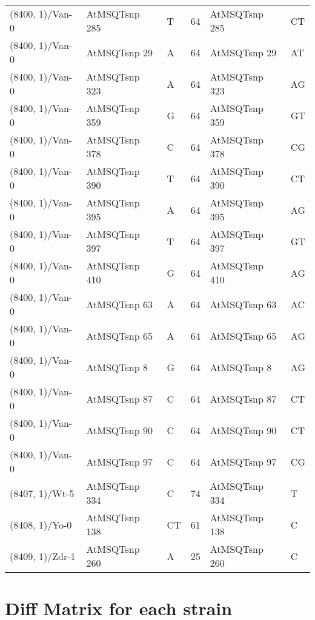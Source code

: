 \begin{center}
\begin{longtable}{|l|l|l|l|l|l|}
(8400, 1)/Van-0&AtMSQTsnp 285&T&64&AtMSQTsnp 285&CT\\
(8400, 1)/Van-0&AtMSQTsnp 29&A&64&AtMSQTsnp 29&AT\\
(8400, 1)/Van-0&AtMSQTsnp 323&A&64&AtMSQTsnp 323&AG\\
(8400, 1)/Van-0&AtMSQTsnp 359&G&64&AtMSQTsnp 359&GT\\
(8400, 1)/Van-0&AtMSQTsnp 378&C&64&AtMSQTsnp 378&CG\\
(8400, 1)/Van-0&AtMSQTsnp 390&T&64&AtMSQTsnp 390&CT\\
(8400, 1)/Van-0&AtMSQTsnp 395&A&64&AtMSQTsnp 395&AG\\
(8400, 1)/Van-0&AtMSQTsnp 397&T&64&AtMSQTsnp 397&GT\\
(8400, 1)/Van-0&AtMSQTsnp 410&G&64&AtMSQTsnp 410&AG\\
(8400, 1)/Van-0&AtMSQTsnp 63&A&64&AtMSQTsnp 63&AC\\
(8400, 1)/Van-0&AtMSQTsnp 65&A&64&AtMSQTsnp 65&AG\\
(8400, 1)/Van-0&AtMSQTsnp 8&G&64&AtMSQTsnp 8&AG\\
(8400, 1)/Van-0&AtMSQTsnp 87&C&64&AtMSQTsnp 87&CT\\
(8400, 1)/Van-0&AtMSQTsnp 90&C&64&AtMSQTsnp 90&CT\\
(8400, 1)/Van-0&AtMSQTsnp 97&C&64&AtMSQTsnp 97&CG\\
(8407, 1)/Wt-5&AtMSQTsnp 334&C&74&AtMSQTsnp 334&T\\
(8408, 1)/Yo-0&AtMSQTsnp 138&CT&61&AtMSQTsnp 138&C\\
(8409, 1)/Zdr-1&AtMSQTsnp 260&A&25&AtMSQTsnp 260&C\\
\hline
\end{longtable}
\end{center}

\section{Diff Matrix for each strain} \label{section_strain_wise}
